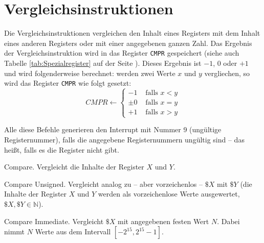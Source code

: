 \section{Vergleichsinstruktionen}
\label{sec:Vergleichsinstruktionen}

Die Vergleichsinstruktionen vergleichen den Inhalt eines Registers mit dem
Inhalt eines anderen Registers oder mit einer angegebenen ganzen Zahl. Das
Ergebnis der Vergleichsinstruktion wird in das Register \texttt{CMPR}
gespeichert (siehe auch Tabelle \ref{tab:Spezialregister} auf der Seite
\pageref{tab:Spezialregister}). Dieses Ergebnis ist $-1$, $0$ oder $+1$ und wird
folgenderweise berechnet: werden zwei Werte $x$ und $y$ vergliechen, so wird das
Register \texttt{CMPR} wie folgt gesetzt:
\[
    CMPR \gets
    \begin{cases}
        -1 & \text{ falls } x < y  \\
     \pm 0 & \text{ falls } x = y  \\
        +1 & \text{ falls } x > y 
    \end{cases}
\]

Alle diese Befehle generieren den Interrupt mit Nummer 9 (ungültige
Registernummer), falls die angegebene Registernummern ungültig sind -- das
heißt, falls es die Register nicht gibt.



\glqq Compare\grqq.
Vergleicht die Inhalte der Register $X$ und $Y$.


\glqq Compare Unsigned\grqq.
Vergleicht analog zu  -- aber vorzeichenlos -- $\$X$ mit $\$Y$
(die Inhalte der Register $X$ und $Y$ werden als vorzeichenlose Werte
ausgewertet, $\$X, \$Y \in \mathds{N}$).


\glqq Compare Immediate\grqq. 
Vergleicht $\$X$ mit angegebenen festen Wert $N$. Dabei nimmt $N$ Werte aus dem
Intervall $[-2^{15}, 2^{15}-1]$.


